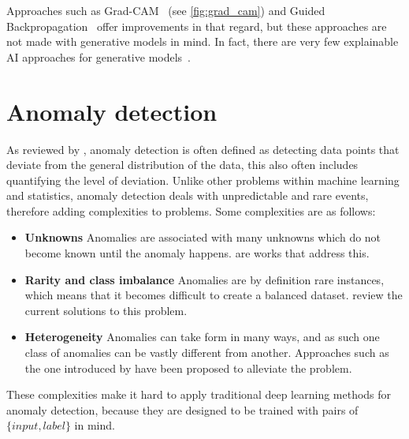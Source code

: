 \par
Approaches such as Grad-CAM~\cite{GradCam} (see \autoref{fig:grad_cam}) and Guided Backpropagation~\cite{guided_backprop} offer improvements in that regard, but these approaches are not made with generative models in mind. In fact, there are very few explainable AI approaches for generative models~\cite{XAI}.
\section{Anomaly detection}
\label{sec:anomaly_detection}
As reviewed by \textcite{anomaly_detection}, anomaly detection is often defined as detecting data points that deviate from the general distribution of the data, this also often includes quantifying the level of deviation. Unlike other problems within machine learning and statistics, anomaly detection deals with unpredictable and rare events, therefore adding complexities to problems. Some complexities are as follows:
\begin{itemize}
    \item \textbf{Unknowns} Anomalies are associated with many unknowns which do not become known until the anomaly happens. \textcite{unknown_detection1,unknown_detection2} are works that address this.
    \item \textbf{Rarity and class imbalance} Anomalies are by definition rare instances, which means that it becomes difficult to create a balanced dataset. \textcite{class_imbalance1} review the current solutions to this problem.
    \item \textbf{Heterogeneity} Anomalies can take form in many ways, and as such one class of anomalies can be vastly different from another. Approaches such as the one introduced by \textcite{heterogeneous1} have been proposed to alleviate the problem.
\end{itemize}
These complexities make it hard to apply traditional deep learning methods for anomaly detection, because they are designed to be trained with pairs of $\{input, label\}$ in mind.
